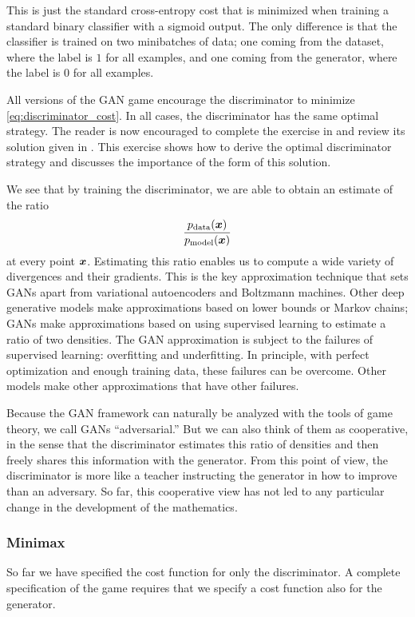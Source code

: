 This is just the standard cross-entropy cost that is minimized when training a standard binary classifier
with a sigmoid output.
The only difference is that the classifier is trained on two minibatches of data; one coming from the
dataset, where the label is $1$ for all examples, and one coming from the generator, where the label
is $0$ for all examples.

All versions of the GAN game encourage the discriminator to minimize \eqref{eq:discriminator_cost}.
In all cases, the discriminator has the same optimal strategy.
The reader is now encouraged to complete the exercise in  and review its solution
given in . This exercise shows how to derive the optimal discriminator strategy
and discusses the importance of the form of this solution.

We see that by training the discriminator, we are able to obtain an estimate of the ratio
\[
  \frac{p_{\rm{data}}({\bm{x}})}{p_{\rm{model}}({\bm{x}})}
\]
at every point ${\bm{x}}$.
Estimating this ratio enables us to compute a wide variety of divergences and their gradients.
This is the key approximation technique that sets GANs apart from variational autoencoders
and Boltzmann machines.
Other deep generative models make approximations based on lower bounds or Markov chains;
GANs make approximations based on using supervised learning to estimate a ratio of two densities.
The GAN approximation is subject to the failures of supervised learning: overfitting and underfitting.
In principle, with perfect optimization and enough training data, these failures can be overcome.
Other models make other approximations that have other failures.

Because the GAN framework can naturally be analyzed with the tools of game theory,
we call GANs ``adversarial.'' But we can also think of them as cooperative, in
the sense that the discriminator estimates this ratio of densities and then freely
shares this information with the generator.
From this point of view, the discriminator is more like a teacher instructing the
generator in how to improve than an adversary.
So far, this cooperative view has not led to any particular change in the development
of the mathematics.

\subsubsection{Minimax}

So far we have specified the cost function for only the discriminator.
A complete specification of the game requires that we specify a cost function also
for the generator.

